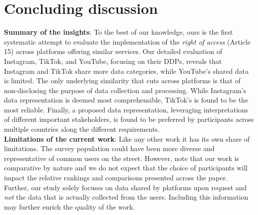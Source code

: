 \section{Concluding discussion}
\label{Sec: Discussion}
\textbf{Summary of the insights}: To the best of our knowledge, ours is the first systematic attempt to evaluate the implementation of the \textit{right of access} (Article 15) across platforms offering similar services.
Our detailed evaluation of Instagram, TikTok, and YouTube, focusing on their DDPs, reveals that Instagram and TikTok share more data categories, while YouTube’s shared data is limited.
The only underlying similarity that cuts across platforms is that of non-disclosing the purpose of data collection and processing. 
While Instagram’s data representation is deemed most comprehensible, TikTok’s is found to be the most reliable. 
Finally, a proposed data representation, leveraging interpretations of different important stakeholders, is found to be preferred by participants across multiple countries along the different requirements.\\
\noindent
\textbf{Limitations of the current work}: Like any other work it has its own share of limitations. 
The survey population could have been more diverse and representative of common users on the street. 
However, note that our work is comparative by nature and we do not expect that the choice of participants will impact the relative rankings and comparisons presented across the paper. 
Further, our study solely focuses on data shared by platforms upon request and \textit{not} the data that is actually collected from the users. 
Including this information may further enrich the quality of the work.

